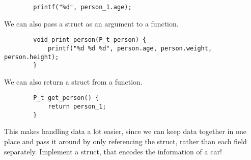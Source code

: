 \documentclass{dcbl/challenge}
\begin{document}
\begin{aufgabe}
\begin{lstlisting}
        printf("%d", person_1.age); 
    \end{lstlisting}
    We can also pass a struct as an argument to a function.
    \begin{lstlisting}
        void print_person(P_t person) {
            printf("%d %d %d", person.age, person.weight, person.height);
        }
    \end{lstlisting}
    We can also return a struct from a function.
    \begin{lstlisting}
        P_t get_person() {
            return person_1;
        }
    \end{lstlisting}
    This makes handling data a lot easier, since we can keep data together in one place and pass it around by only referencing the struct, rather than each field separately.
    Implement a struct, that encodes the information of a car!    
\end{aufgabe}
\end{document}
